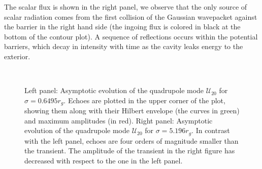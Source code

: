 \documentclass[article,aps,nofootinbib,twocolumn,superscriptaddress]{revtex4-1}
\begin{document}
The scalar flux is shown in the right panel, we observe that the only source of scalar radiation comes from the first collision of the Gaussian wavepacket against the barrier in the right hand side (the ingoing flux is colored in black at the bottom of the contour plot). A sequence of reflections occurs within the potential barriers, which decay in intensity with time as the cavity leaks energy to the exterior.

\begin{figure}
\centering
{} \,
\caption{\label{fig:asympt_two_sigmas} Left panel: Asymptotic evolution of the quadrupole mode $\mathcal{U}_{20}$ for $\sigma=0.6495r_g$. Echoes are plotted in the upper corner of the plot, showing them along with their Hilbert envelope (the curves in green) and maximum amplitudes (in red). Right panel: Asymptotic evolution of the quadrupole mode $\mathcal{U}_{20}$ for $\sigma=5.196r_g$. In contrast with the left panel, echoes are four orders of magnitude smaller than the transient. The amplitude of the transient in the right figure has decreased with respect to the one in the left panel.} 
\end{figure}
\end{document}
